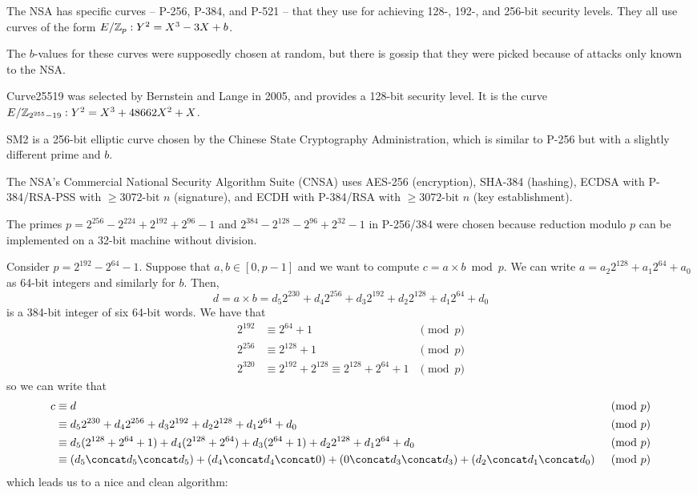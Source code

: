\documentclass[class=co487,tikz,minted,notes]{agony}
\begin{document}
The NSA has specific curves -- P-256, P-384, and P-521 -- that they use
for achieving 128-, 192-, and 256-bit security levels.
They all use curves of the form $E/\mathbb{Z}_p : Y^2 = X^3 - 3X + b$.

The $b$-values for these curves were supposedly chosen at random,
but there is gossip that they were picked because of attacks only known to the NSA.

Curve25519 was selected by Bernstein and Lange in 2005,
and provides a 128-bit security level.
It is the curve $E/\mathbb{Z}_{2^{255}-19} : Y^2 = X^3 + 48662X^2 + X$.

SM2 is a 256-bit elliptic curve chosen by the Chinese State Cryptography Administration,
which is similar to P-256 but with a slightly different prime and $b$.

The NSA's Commercial National Security Algorithm Suite (CNSA)
uses AES-256 (encryption), SHA-384 (hashing), ECDSA with P-384/RSA-PSS with $\geq3072$-bit $n$ (signature),
and ECDH with P-384/RSA with $\geq3072$-bit $n$ (key establishment).

The primes $p = 2^{256} - 2^{224} + 2^{192} + 2^{96} - 1$
and $2^{384} - 2^{128} - 2^{96} + 2^{32} - 1$ in P-256/384 were chosen
because reduction modulo $p$ can be implemented on a 32-bit machine without division.

Consider $p = 2^{192} - 2^{64} - 1$.
Suppose that $a,b \in [0,p-1]$ and we want to compute $c = a \times b \bmod p$.
We can write $a = a_2 2^{128} + a_1 2^{64} + a_0$ as 64-bit integers and similarly for $b$.
Then,
\[ d = a \times b = d_5 2^{230} + d_4 2^{256} + d_3 2^{192} + d_2 2^{128} + d_1 2^{64} + d_0 \]
is a 384-bit integer of six 64-bit words.
We have that
\begin{align*}
  2^{192} & \equiv 2^{64} + 1                                    & \pmod p \\
  2^{256} & \equiv 2^{128} + 1                                   & \pmod p \\
  2^{320} & \equiv 2^{192} + 2^{128} \equiv 2^{128} + 2^{64} + 1 & \pmod p
\end{align*}
so we can write that
\begin{align*}
  c & \equiv d                                                                                                                         & \pmod p \\
    & \equiv d_5 2^{230} + d_4 2^{256} + d_3 2^{192} + d_2 2^{128} + d_1 2^{64} + d_0                                                  & \pmod p \\
    & \equiv d_5(2^{128} + 2^{64} + 1) + d_4(2^{128} + 2^{64}) + d_3(2^{64} + 1) + d_2 2^{128} + d_1 2^{64} + d_0                      & \pmod p \\
    & \equiv (d_5 \concat d_5 \concat d_5) + (d_4 \concat d_4 \concat 0) + (0 \concat d_3 \concat d_3) + (d_2 \concat d_1 \concat d_0) & \pmod p
\end{align*}
which leads us to a nice and clean algorithm:
\end{document}
